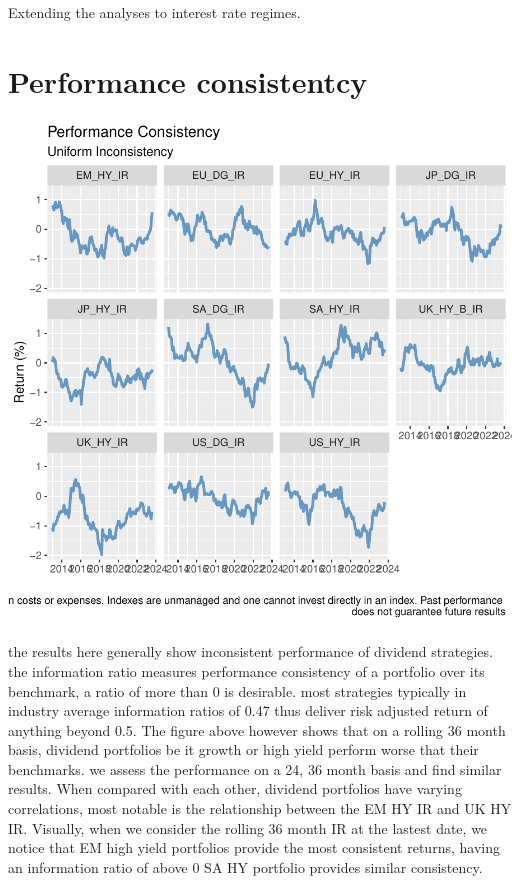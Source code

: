 \documentclass[11pt,preprint, authoryear]{elsarticle}
\let\origfigure\figure
\let\endorigfigure\endfigure
\renewenvironment{figure}[1][2] {
    \expandafter\origfigure\expandafter[H]
} {
    \endorigfigure
}
\numberwithin{equation}{section}
\numberwithin{figure}{section}
\numberwithin{table}{section}
\begin{document}
Extending the analyses to interest rate regimes.

\hypertarget{performance-consistentcy}{%
\section*{Performance consistentcy}\label{performance-consistentcy}}

\begin{figure}[H]

\includegraphics{ThesisWriteUp_files/figure-latex/unnamed-chunk-1-1} \hfill{}

\caption{Rolling 3 Year Returns \label{fig1}}\label{fig:unnamed-chunk-1}
\end{figure}

the results here generally show inconsistent performance of dividend
strategies. the information ratio measures performance consistency of a
portfolio over its benchmark, a ratio of more than 0 is desirable. most
strategies typically in industry average information ratios of 0.47 thus
deliver risk adjusted return of anything beyond 0.5. The figure above
however shows that on a rolling 36 month basis, dividend portfolios be
it growth or high yield perform worse that their benchmarks. we assess
the performance on a 24, 36 month basis and find similar results. When
compared with each other, dividend portfolios have varying correlations,
most notable is the relationship between the EM HY IR and UK HY IR.
Visually, when we consider the rolling 36 month IR at the lastest date,
we notice that EM high yield portfolios provide the most consistent
returns, having an information ratio of above 0 SA HY portfolio provides
similar consistency.
\end{document}
